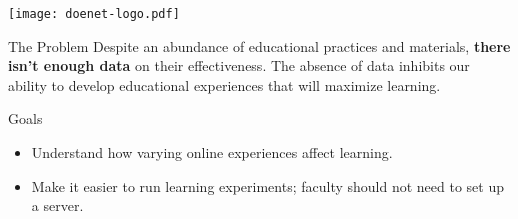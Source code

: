 \vspace{-1.5in}
\texttt{[image: doenet-logo.pdf]}

\begin{sectionblock}{The Problem}
  Despite an abundance of educational practices and materials, \textbf{there isn't
    enough data} on their effectiveness. The absence of data inhibits our
  ability to develop educational experiences that will maximize learning.
\end{sectionblock}

\begin{sectionblock}{Goals}
  \begin{itemize}
  \item Understand how varying online experiences affect learning.
  \item Make it easier to run learning experiments; faculty should not need to set up a server.
  \end{itemize}
\end{sectionblock}
  






